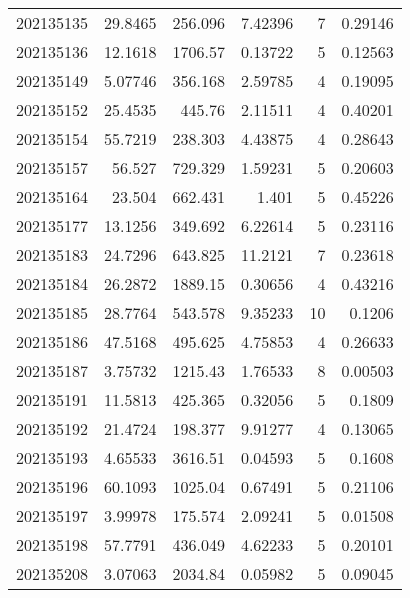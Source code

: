 \begin{tabular}{rrrrrr}
 202135135 &         29.8465  &      256.096  &            7.42396 &           7 & 0.29146 \\
 202135136 &         12.1618  &     1706.57   &            0.13722 &           5 & 0.12563 \\
 202135149 &          5.07746 &      356.168  &            2.59785 &           4 & 0.19095 \\
 202135152 &         25.4535  &      445.76   &            2.11511 &           4 & 0.40201 \\
 202135154 &         55.7219  &      238.303  &            4.43875 &           4 & 0.28643 \\
 202135157 &         56.527   &      729.329  &            1.59231 &           5 & 0.20603 \\
 202135164 &         23.504   &      662.431  &            1.401   &           5 & 0.45226 \\
 202135177 &         13.1256  &      349.692  &            6.22614 &           5 & 0.23116 \\
 202135183 &         24.7296  &      643.825  &           11.2121  &           7 & 0.23618 \\
 202135184 &         26.2872  &     1889.15   &            0.30656 &           4 & 0.43216 \\
 202135185 &         28.7764  &      543.578  &            9.35233 &          10 & 0.1206  \\
 202135186 &         47.5168  &      495.625  &            4.75853 &           4 & 0.26633 \\
 202135187 &          3.75732 &     1215.43   &            1.76533 &           8 & 0.00503 \\
 202135191 &         11.5813  &      425.365  &            0.32056 &           5 & 0.1809  \\
 202135192 &         21.4724  &      198.377  &            9.91277 &           4 & 0.13065 \\
 202135193 &          4.65533 &     3616.51   &            0.04593 &           5 & 0.1608  \\
 202135196 &         60.1093  &     1025.04   &            0.67491 &           5 & 0.21106 \\
 202135197 &          3.99978 &      175.574  &            2.09241 &           5 & 0.01508 \\
 202135198 &         57.7791  &      436.049  &            4.62233 &           5 & 0.20101 \\
 202135208 &          3.07063 &     2034.84   &            0.05982 &           5 & 0.09045 \\

\end{tabular}
